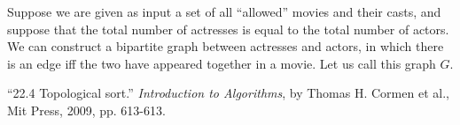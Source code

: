 \documentclass[addpoints]{exam}
\begin{document}
\begin{questions}
Suppose we are given as input a set of all ``allowed'' movies and their casts, and suppose that the total number of actresses is equal to the total number of actors. We can construct a bipartite graph between actresses and actors, in which there is an edge iff the two have appeared together in a movie. Let us call this graph $G$.  


\end{questions}

\begin{thebibliography}{9}

 \enquote{22.4 Topological sort.} \textit{Introduction to Algorithms}, by Thomas H. Cormen et al., Mit Press, 2009, pp. 613-613.

\end{thebibliography}
\end{document}
